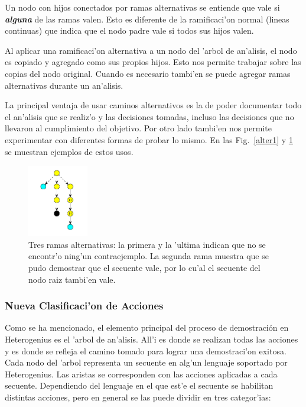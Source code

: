 Un nodo con hijos conectados por ramas alternativas se entiende que vale si \textit{\textbf{alguna}} de las ramas valen. Esto es diferente de la ramificaci'on normal (lineas continuas) que indica que el nodo padre vale si todos sus hijos valen.

Al aplicar una ramificaci'on alternativa a un nodo del 'arbol de an'alisis, el nodo es copiado y agregado como sus propios hijos. Esto nos permite trabajar sobre las copias del nodo original. Cuando es necesario tambi'en se puede agregar ramas alternativas durante un an'alisis.
 
La principal ventaja de usar caminos alternativos es la de poder documentar todo el an'alisis que se realiz'o y las decisiones tomadas, incluso las decisiones que no llevaron al cumplimiento del objetivo. Por otro lado tambi'en nos permite experimentar con diferentes formas de probar lo mismo.
En las Fig.~\ref{alter1} y \ref{alter2} se muestran ejemplos de estos usos.

\begin{figure}[bth]
	\includegraphics[width=100px]{img/ramas_alternativas.png}
	\centering
	\caption{Tres ramas alternativas: la primera y la 'ultima indican que no se encontr'o ning'un contraejemplo. La segunda rama muestra que se pudo demostrar que el secuente vale, por lo cu'al el secuente del nodo raiz tambi'en vale.}
        \label{alter2}
\end{figure}



\subsubsection{Nueva Clasificaci'on de Acciones}

Como se ha mencionado, el elemento principal del proceso de demostración en Heterogenius es el 'arbol de an'alisis. All'i es donde se realizan todas las acciones y es donde se refleja el camino tomado para lograr una demostraci'on exitosa. Cada nodo del 'arbol representa un secuente en alg'un lenguaje soportado por Heterogenius. Las aristas se corresponden con las acciones aplicadas a cada secuente. Dependiendo del lenguaje en el que est'e el secuente se habilitan distintas acciones, pero en general se las puede dividir en tres categor'ias:

